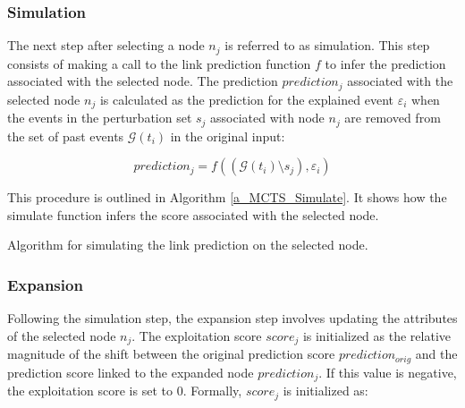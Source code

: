 \newpage

\FloatBarrier
\subsubsection{Simulation}
\label{s_Methodology_CoDy_Simulation}
The next step after selecting a node $n_j$ is referred to as simulation. This step consists of making a call to the link prediction function $f$ to infer the prediction associated with the selected node. The prediction $prediction_j$ associated with the selected node $n_j$ is calculated as the prediction for the explained event $\varepsilon_i$ when the events in the perturbation set $s_j$ associated with node $n_j$ are removed from the set of past events $\mathcal{G}(t_i)$ in the original input:

\begin{equation}
    prediction_j = f((\mathcal{G}(t_i) \setminus s_j), \varepsilon_i)
\end{equation}

This procedure is outlined in Algorithm \ref{a_MCTS_Simulate}. It shows how the simulate function infers the score associated with the selected node. %

{
\setlength{\algomargin}{1.25em}
\small
\begin{algorithm}[ht]
\caption{Algorithm for simulating the link prediction on the selected node.}
\label{a_MCTS_Simulate}
\end{algorithm}
}

\FloatBarrier
\subsubsection{Expansion}
\label{s_Methodology_CoDy_Expansion}

Following the simulation step, the expansion step involves updating the attributes of the selected node $n_j$. The exploitation score $score_j$ is initialized as the relative magnitude of the shift between the original prediction score $prediction_{orig}$ and the prediction score linked to the expanded node $prediction_j$. If this value is negative, the exploitation score is set to $0$. Formally, $score_j$ is initialized as:

